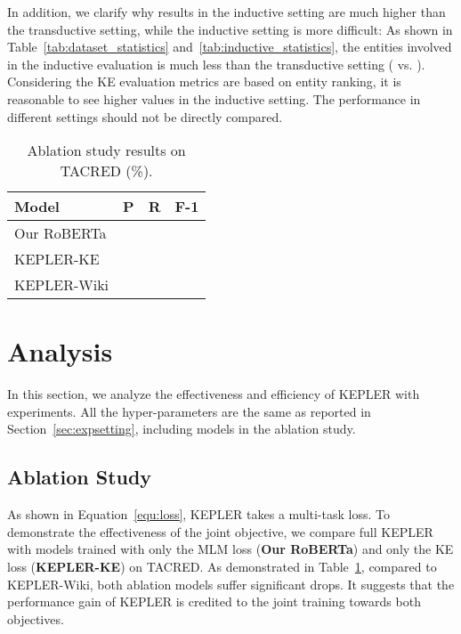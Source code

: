 In addition, we clarify why results in the inductive setting are much higher than the transductive setting, while the inductive setting is more difficult: As shown in Table~\ref{tab:dataset_statistics} and~\ref{tab:inductive_statistics}, the entities involved in the inductive evaluation is much less than the transductive setting ( vs. ). Considering the KE evaluation metrics are based on entity ranking, it is reasonable to see higher values in the inductive setting. The performance in different settings should not be directly compared.




\begin{table}[t]
    \tablefont
	\centering
	\begin{adjustbox}{max width=0.98\linewidth}
	\begin{tabular}{lccc}
	\toprule
		\textbf{Model} & \textbf{P} & \textbf{R} & \textbf{F-1}\\
	\midrule
Our RoBERTa &  &  & \\
		KEPLER-KE &  &  &  \\
		KEPLER-Wiki &  &  & \\
	\bottomrule
	\end{tabular}
	\end{adjustbox}
	\caption{Ablation study results on TACRED (\%).}\label{tab:abl}
\end{table}
\section{Analysis}
In this section, we analyze the effectiveness and efficiency of KEPLER with experiments. All the hyper-parameters are the same as reported in Section~\ref{sec:expsetting}, including models in the ablation study.

\subsection{Ablation Study}
\label{sec:ablation}
As shown in Equation~\ref{equ:loss}, KEPLER takes a multi-task loss. To demonstrate the effectiveness of the joint objective, we compare full KEPLER with models trained with only the MLM loss (\textbf{Our RoBERTa}) and only the KE loss (\textbf{KEPLER-KE}) on TACRED. As demonstrated in Table~\ref{tab:abl}, compared to KEPLER-Wiki, both ablation models suffer significant drops. It suggests that the performance gain of KEPLER is credited to the joint training towards both objectives. 



